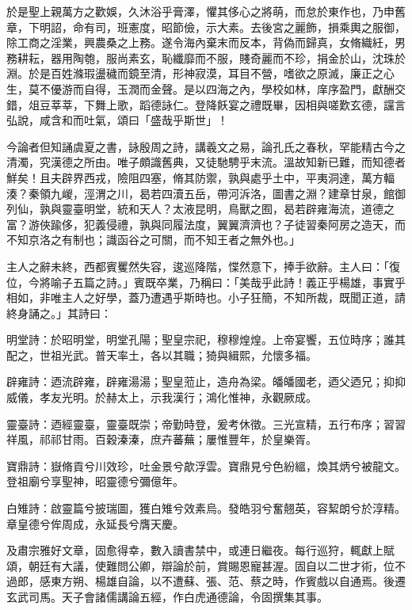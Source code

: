 \begin{pinyinscope}
於是聖上親萬方之歡娛，久沐浴乎膏澤，懼其侈心之將萌，而怠於東作也，乃申舊章，下明詔，命有司，班憲度，昭節儉，示大素。去後宮之麗飾，損乘輿之服御，除工商之淫業，興農桑之上務。遂令海內棄末而反本，背偽而歸真，女脩織紝，男務耕耘，器用陶匏，服尚素玄，恥纖靡而不服，賤奇麗而不珍，捐金於山，沈珠於淵。於是百姓滌瑕盪穢而鏡至清，形神寂漠，耳目不營，嗜欲之原滅，廉正之心生，莫不優游而自得，玉潤而金聲。是以四海之內，學校如林，庠序盈門，獻酬交錯，俎豆莘莘，下舞上歌，蹈德詠仁。登降飫宴之禮既畢，因相與嗟歎玄德，讜言弘說，咸含和而吐氣，頌曰「盛哉乎斯世」！

今論者但知誦虞夏之書，詠殷周之詩，講羲文之易，論孔氏之春秋，罕能精古今之清濁，究漢德之所由。唯子頗識舊典，又徒馳騁乎末流。溫故知新已難，而知德者鮮矣！且夫辟界西戎，險阻四塞，脩其防禦，孰與處乎土中，平夷洞達，萬方輻湊？秦領九嵕，涇渭之川，曷若四瀆五岳，帶河泝洛，圖書之淵？建章甘泉，館御列仙，孰與靈臺明堂，統和天人？太液昆明，鳥獸之囿，曷若辟雍海流，道德之富？游俠踰侈，犯義侵禮，孰與同履法度，翼翼濟濟也？子徒習秦阿房之造天，而不知京洛之有制也；識函谷之可關，而不知王者之無外也。」

主人之辭未終，西都賓矍然失容，逡巡降階，惵然意下，捧手欲辭。主人曰：「復位，今將喻子五篇之詩。」賓既卒業，乃稱曰：「美哉乎此詩！義正乎楊雄，事實乎相如，非唯主人之好學，蓋乃遭遇乎斯時也。小子狂簡，不知所裁，既聞正道，請終身誦之。」其詩曰：

明堂詩：於昭明堂，明堂孔陽；聖皇宗祀，穆穆煌煌。上帝宴饗，五位時序；誰其配之，世祖光武。普天率土，各以其職；猗與緝熙，允懷多福。

辟雍詩：迺流辟雍，辟雍湯湯；聖皇蒞止，造舟為梁。皤皤國老，迺父迺兄；抑抑威儀，孝友光明。於赫太上，示我漢行；鴻化惟神，永觀厥成。

靈臺詩：迺經靈臺，靈臺既崇；帝勤時登，爰考休徵。三光宣精，五行布序；習習祥風，祁祁甘雨。百穀溱溱，庶卉蕃蕪；屢惟豐年，於皇樂胥。

寶鼎詩：嶽脩貢兮川效珍，吐金景兮歊浮雲。寶鼎見兮色紛縕，煥其炳兮被龍文。登祖廟兮享聖神，昭靈德兮彌億年。

白雉詩：啟靈篇兮披瑞圖，獲白雉兮效素烏。發皓羽兮奮翹英，容絜朗兮於淳精。章皇德兮侔周成，永延長兮膺天慶。

及肅宗雅好文章，固愈得幸，數入讀書禁中，或連日繼夜。每行巡狩，輒獻上賦頌，朝廷有大議，使難問公卿，辯論於前，賞賜恩寵甚渥。固自以二世才術，位不過郎，感東方朔、楊雄自論，以不遭蘇、張、范、蔡之時，作賓戲以自通焉。後遷玄武司馬。天子會諸儒講論五經，作白虎通德論，令固撰集其事。


\end{pinyinscope}
